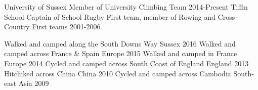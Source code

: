 \begin{cvhonors}
  \cvhonor
    {University of Sussex}
    {Member of University Climbing Team}
    {}
    {2014-Present}
  \cvhonor
    {Tiffin School}
    {Captain of School Rugby First team, member of Rowing and Cross-Country First teams}
    {}
    {2001-2006}
\end{cvhonors}

\begin{cvhonors}
  \cvhonor
    {Walked and camped along the South Downs Way}
    {}
    {Sussex}
    {2016}
  \cvhonor
    {Walked and camped across France \& Spain}
    {}
    {Europe}
    {2015}
  \cvhonor
    {Walked and camped in France}
    {}
    {Europe}
    {2014}
  \cvhonor
    {Cycled and camped across South Coast of England}
    {}
    {England}
    {2013}
 \cvhonor
    {Hitchiked across China}
    {}
    {China}
    {2010}
 \cvhonor
    {Cycled and camped across Cambodia}
    {}
    {South-east Asia}
    {2009}
\end{cvhonors}

